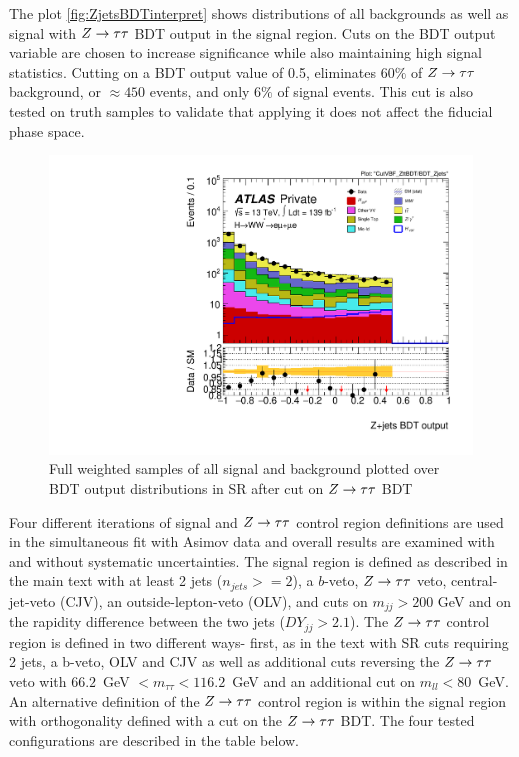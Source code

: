 The plot \ref{fig:ZjetsBDTinterpret} shows distributions of all backgrounds as well as signal with $Z\rightarrow\tau\tau$ BDT output in the signal region. Cuts on the BDT output variable are chosen to increase significance while also maintaining high signal statistics. Cutting on a BDT output value of 0.5, eliminates $60\%$ of $Z\rightarrow\tau\tau$ background, or $\approx 450$ events, and only $6\%$ of signal events. This cut is also tested on truth samples to validate that applying it does not affect the fiducial phase space. 

\begin{figure}[!htbp]
\centering
\includegraphics[width=.6\linewidth]{Pictures/ZttBDT/run2-emme-CutVBF_ZttBDT-BDT_Zjets-log.pdf}
\caption{Full weighted samples of all signal and background plotted over BDT output distributions in SR after cut on $Z\rightarrow\tau\tau$ BDT}
\label{fig:ZjetsBDTintepret}
\end{figure}

Four different iterations of signal and $Z\rightarrow\tau\tau$ control region definitions are used in the simultaneous fit with Asimov data and overall results are examined with and without systematic uncertainties. The signal region is defined as described in the main text with at least 2 jets ($n_{jets}>=2$), a $b$-veto, $Z\rightarrow\tau\tau$ veto, central-jet-veto (CJV), an outside-lepton-veto (OLV), and cuts on $m_{jj}>200$ GeV and on the rapidity difference between the two jets ($DY_{jj}>2.1$). The $Z\rightarrow\tau\tau$ control region is defined in two different ways- first, as in the text with SR cuts requiring 2 jets, a b-veto, OLV and CJV as well as additional cuts reversing the $Z\rightarrow\tau\tau$ veto with $66.2$~GeV $< m_{\tau\tau}< 116.2 $~GeV and an additional cut on $m_{ll}<80$~GeV. An alternative definition of the $Z\rightarrow\tau\tau$ control region is within the signal region with orthogonality defined with a cut on the $Z\rightarrow\tau\tau$ BDT. The four tested configurations are described in the table below. 

